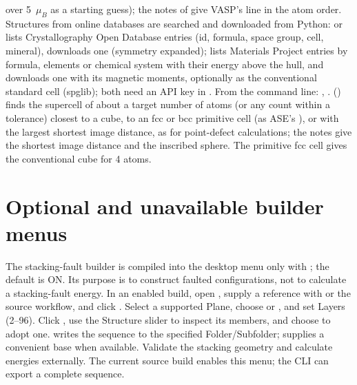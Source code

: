 over 5~$\mu_B$ as a starting guess); the notes of  give VASP's  line in the atom order. Structures from online databases are searched and downloaded from Python:  or  lists Crystallography Open Database entries (id, formula, space group, cell, mineral),  downloads one (symmetry expanded);  lists Materials Project entries by formula, elements or chemical system with their energy above the hull, and  downloads one with its magnetic moments, optionally as the conventional standard cell (spglib); both need an API key in . From the command line: , .  () finds the supercell of about a target number of atoms (or any count within a tolerance) closest to a cube, to an fcc or bcc primitive cell (as ASE's ), or with the largest shortest image distance, as for point-defect calculations; the notes give the shortest image distance and the inscribed sphere. The primitive fcc cell gives the conventional cube for 4 atoms.

\section{Optional and unavailable builder menus}
The stacking-fault builder is compiled into the desktop menu only with ; the default is ON. Its purpose is to construct faulted configurations, not to calculate a stacking-fault energy. In an enabled build, open , supply a reference with  or the source workflow, and click . Select a supported Plane, choose  or , and set Layers (2--96). Click , use the Structure slider to inspect its members, and choose  to adopt one.  writes the sequence to the specified Folder/Subfolder;  supplies a convenient base when available. Validate the stacking geometry and calculate energies externally. The current source build enables this menu; the CLI can export a complete sequence.

